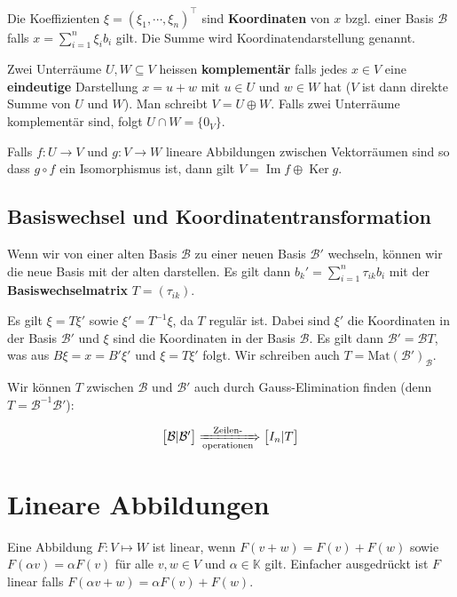 \documentclass[a4paper,10pt]{article}
\def\K{\mathbb{K}}
\begin{document}
Die Koeffizienten $\xi = (\xi_1, \cdots, \xi_n)^\top$ sind \textbf{Koordinaten} von $x$ bzgl. einer Basis $\mathcal{B}$ falls $x = \sum_{i=1}^n \xi_i b_i$ gilt. Die Summe wird Koordinatendarstellung genannt.

Zwei Unterräume $U, W \subseteq V$ heissen \textbf{komplementär} falls jedes $x \in V$ eine \textbf{eindeutige} Darstellung $x = u + w$ mit $u \in U$ und $w \in W$ hat ($V$ ist dann direkte Summe von $U$ und $W$). Man schreibt $V = U \oplus W$. Falls zwei Unterräume komplementär sind, folgt $U \cap W = \{0_V\}$.

Falls  $f: U \rightarrow V$ und $g: V \rightarrow W$ lineare Abbildungen zwischen Vektorräumen sind so dass $ g \circ f$ ein Isomorphismus ist, dann gilt $V = \operatorname{Im}f \oplus \operatorname{Ker} g$.

\subsection{Basiswechsel und Koordinatentransformation}

Wenn wir von einer alten Basis $\mathcal{B}$ zu einer neuen Basis $\mathcal{B}'$ wechseln, können wir die neue Basis mit der alten darstellen. Es gilt dann $b_k' = \sum_{i=1}^n \tau_{ik} b_i$ mit der \textbf{Basiswechselmatrix} $T = (\tau_{ik})$.

Es gilt $\xi = T \xi'$ sowie $\xi' = T^{-1} \xi$, da $T$ regulär ist. Dabei sind $\xi'$ die Koordinaten in der Basis $\mathcal{B}'$ und $\xi$ sind die Koordinaten in der Basis $\mathcal{B}$. Es gilt dann $\mathcal{B}' = \mathcal{B} T$, was aus $B \xi = x = B' \xi'$ und $\xi = T \xi'$ folgt. Wir schreiben auch $T = \text{Mat}(\mathcal{B'})_{\mathcal{B}}$.

Wir können $T$ zwischen $\mathcal{B}$ und $\mathcal{B}'$ auch durch Gauss-Elimination finden (denn $T = \mathcal{B}^{-1} \mathcal{B'}$):

$$\begin{bmatrix*}
  \mathcal{B} | \mathcal{B}'
\end{bmatrix*} \xRightarrow[\text{operationen}]{\text{Zeilen-}} \begin{bmatrix*}
  I_n | T
\end{bmatrix*}$$

\section{Lineare Abbildungen}

Eine Abbildung $F: V \mapsto W$ ist linear, wenn $F(v + w) = F(v) + F(w)$ sowie $F(\alpha v) = \alpha F(v)$ für alle $v, w \in V$ und $\alpha \in \K$ gilt. Einfacher ausgedrückt ist $F$ linear falls $F(\alpha v + w) = \alpha F(v) + F(w)$. 
\end{document}
